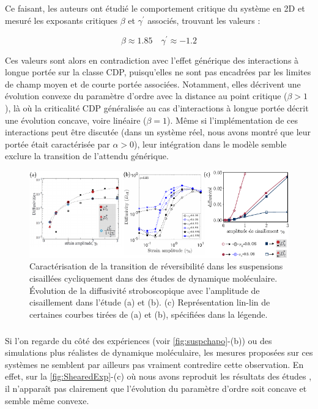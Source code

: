 \subparagraph{}Ce faisant, les auteurs ont étudié le comportement critique du système en 2D et mesuré les exposants critiques $\beta$ et $\gamma^\prime$ associés, trouvant les valeurs :

\begin{equation}
	\beta \approx 1.85 \quad \gamma^\prime \approx -1.2
\end{equation}

\noindent Ces valeurs sont alors en contradiction avec l'effet générique des interactions à longue portée sur la classe CDP, puisqu'elles ne sont pas encadrées par les limites de champ moyen et de courte portée associées. Notamment, elles décrivent une évolution convexe du paramètre d'ordre avec la distance au point critique ($\beta >1$), là où la criticalité CDP généralisée au cas d'interactions à longue portée décrit une évolution concave, voire linéaire ($\beta = 1$). Même si l'implémentation de ces interactions peut être discutée (dans un système réel, nous avons montré que leur portée était caractérisée par $\alpha > 0$), leur intégration dans le modèle semble exclure la transition de l'attendu générique.


\begin{figure}[h]
	\centering
	\includegraphics[width=\textwidth]{Chapitre1/Figures/LongRange/ExpShear.pdf}
	\caption{Caractérisation de la transition de réversibilité dans les suspensions cisaillées cycliquement dans des études de dynamique moléculaire. Évolution de la diffusivité stroboscopique avec l'amplitude de cisaillement dans l'étude \cite{metzger_irreversibility_2010} (a) et \cite{agrawal_dense_2024} (b). (c) Représentation lin-lin de certaines courbes tirées de (a) et (b), spécifiées dans la légende.}
	\label{fig:ShearedExp}
\end{figure}

\subparagraph{}Si l'on regarde du côté des expériences (voir \autoref{fig:suspchapo}-(b)) ou des simulations plus réalistes de dynamique moléculaire, les mesures proposées sur ces systèmes ne semblent par ailleurs pas vraiment contredire cette observation. En effet, sur la \autoref{fig:ShearedExp}-(c) où nous avons reproduit les résultats des études \cite{metzger_irreversibility_2010, agrawal_dense_2024}, il n'apparaît pas clairement que l'évolution du paramètre d'ordre soit concave et semble même convexe. 

